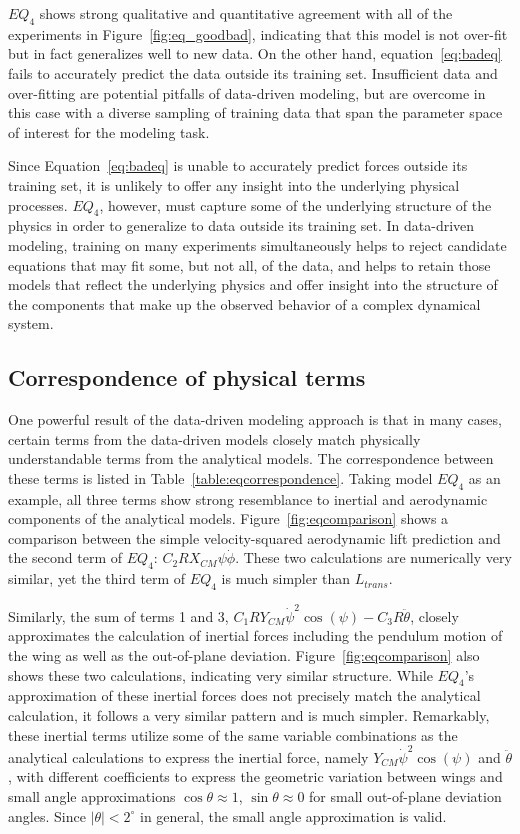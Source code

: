 \documentclass{article}
\begin{document}
$EQ_4$ shows strong qualitative and quantitative agreement with all of the
experiments in Figure~\ref{fig:eq_goodbad}, indicating that this model is not
over-fit but in fact generalizes well to new data. On the other hand,
equation~\eqref{eq:badeq} fails to accurately predict the data outside its
training set.  Insufficient data and over-fitting are potential pitfalls of
data-driven modeling, but are overcome in this case with a diverse sampling of
training data that span the parameter space of interest for the modeling task.

Since Equation~\eqref{eq:badeq} is unable to accurately predict forces outside
its training set, it is unlikely to offer any insight into the underlying
physical processes.  $EQ_4$, however, must capture some of the underlying
structure of the physics in order to generalize to data outside its training
set. In data-driven modeling, training on many experiments simultaneously
helps to reject candidate equations that may fit some, but not all, of the data,
and helps to retain those models that reflect the underlying physics and offer
insight into the structure of the components that make up the observed
behavior of a complex dynamical system.

\subsection*{Correspondence of physical terms}
One powerful result of the data-driven modeling approach is that in many cases,
certain terms from the data-driven models closely match physically
understandable terms from the analytical models.  The correspondence between
these terms is listed in Table~\ref{table:eqcorrespondence}. Taking model $EQ_4$
as an example, all three terms show strong resemblance to inertial and
aerodynamic components of the analytical models.  Figure~\ref{fig:eqcomparison}
shows a comparison between the simple velocity-squared aerodynamic lift
prediction and the second term of $EQ_4$: \(C_2RX_{CM}\psi\dot{\phi}\).  These
two calculations are numerically very similar, yet the third term of $EQ_4$ is
much simpler than $L_{trans}$.

Similarly, the sum of terms 1 and 3, \(C_1RY_{CM}\dot{\psi}^2\cos(\psi) -
C_3R\ddot{\theta}\), closely approximates the calculation of inertial forces
including the pendulum motion of the wing as well as the out-of-plane deviation.
Figure~\ref{fig:eqcomparison} also shows these two calculations, indicating very
similar structure.  While $EQ_4$'s approximation of these inertial forces does
not precisely match the analytical calculation, it follows a very similar
pattern and is much simpler.  Remarkably, these inertial terms utilize some of
the same variable combinations as the analytical calculations to express the
inertial force, namely \(Y_{CM}\dot{\psi}^2\cos(\psi)\) and \(\ddot{\theta}\),
with different coefficients to express the geometric variation between wings and
small angle approximations \(\cos\theta\approx1\), \(\sin\theta\approx0\) for
small out-of-plane deviation angles.  Since \(|\theta|<2^{\circ}\) in general,
the small angle approximation is valid.
\end{document}
